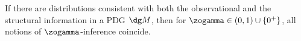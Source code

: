 If there are distributions
consistent with
both the observational and the structural information
in a PDG $\dg M$, 
then for $\zogamma \in (0,1) \cup \{0^+\}$, all
notions of $\zogamma$-inference 
coincide.
